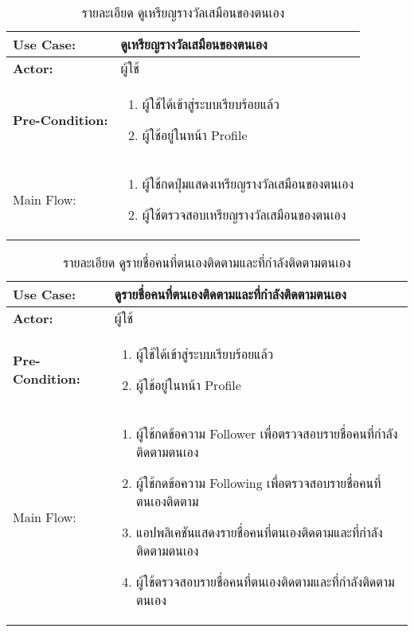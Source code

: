 \begin{table}
    \caption{รายละเอียด ดูเหรียญรางวัลเสมือนของตนเอง}
    \begin{tabularx}{\textwidth}{ | >{\centering\bf} p{3cm} | X |}
        \hline
        Use Case: & ดูเหรียญรางวัลเสมือนของตนเอง \\\hline
        Actor: & ผู้ใช้ \\\hline
        Pre-Condition: &
        \begin{enumerate}[table]
            \item ผู้ใช้ได้เข้าสู่ระบบเรียบร้อยแล้ว
            \item ผู้ใช้อยู่ในหน้า Profile
            
        \end{enumerate} \\\hline
        
        Main Flow: & 
        \begin{enumerate}[table]
            \item ผู้ใช้กดปุ่มแสดงเหรียญรางวัลเสมือนของตนเอง
            \item ผู้ใช้ตรวจสอบเหรียญรางวัลเสมือนของตนเอง
        \end{enumerate}\\\hline
    \end{tabularx}
\end{table}


\begin{table}
    \caption{รายละเอียด ดูรายชื่อคนที่ตนเองติดตามและที่กำลังติดตามตนเอง}
    \begin{tabularx}{\textwidth}{ | >{\centering\bf} p{3cm} | X |}
        \hline
        Use Case: & ดูรายชื่อคนที่ตนเองติดตามและที่กำลังติดตามตนเอง \\\hline
        Actor: & ผู้ใช้ \\\hline
        Pre-Condition: &
        \begin{enumerate}[table]
            \item ผู้ใช้ได้เข้าสู่ระบบเรียบร้อยแล้ว
            \item ผู้ใช้อยู่ในหน้า Profile
        \end{enumerate} \\\hline
        
        Main Flow: & 
        \begin{enumerate}[table]
            \item ผู้ใช้กดข้อความ Follower เพื่อตรวจสอบรายชื่อคนที่กำลังติดตามตนเอง
            \item ผู้ใช้กดข้อความ Following เพื่อตรวจสอบรายชื่อคนที่ตนเองติดตาม
            \item แอปพลิเคชันแสดงรายชื่อคนที่ตนเองติดตามและที่กำลังติดตามตนเอง
            \item ผู้ใช้ตรวจสอบรายชื่อคนที่ตนเองติดตามและที่กำลังติดตามตนเอง
        \end{enumerate} \\\hline
    \end{tabularx}
\end{table}


